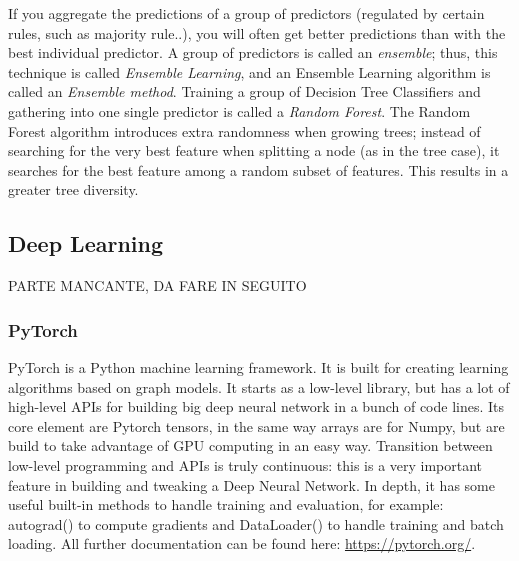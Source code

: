 \documentclass{article}
\begin{document}
If you aggregate the predictions of a group of predictors (regulated by certain rules, such as majority rule..), you will often get better predictions than with the best individual predictor. A group of predictors is called an \textit{ensemble}; thus, this technique is called \textit{Ensemble Learning}, and an Ensemble Learning algorithm is called an \textit{Ensemble method}.
Training a group of Decision Tree Classifiers and gathering into one single predictor is called a \textit{Random Forest}.
The Random Forest algorithm introduces extra randomness when growing trees; instead of searching for the very best feature when splitting a node (as in the tree case), it searches for the best feature among a random subset of features. This results in a greater tree diversity.



\subsection{Deep Learning}

PARTE MANCANTE, DA FARE IN SEGUITO

\subsubsection{PyTorch}

PyTorch is a Python machine learning framework. It is built for creating learning algorithms based on graph models. 
It starts as a low-level library, but has a lot of high-level APIs for building big deep neural network in a bunch of code lines.
Its core element are Pytorch tensors, in the same way arrays are for Numpy, but are build to take advantage of GPU computing in an easy way.
Transition between low-level programming and APIs is truly continuous: this is a very important feature in building and tweaking a Deep Neural Network.
In depth, it has some useful built-in methods to handle training and evaluation, for example: autograd() to compute gradients and DataLoader() to handle training and batch loading.
All further documentation can be found here: \url{https://pytorch.org/}.
\end{document}
